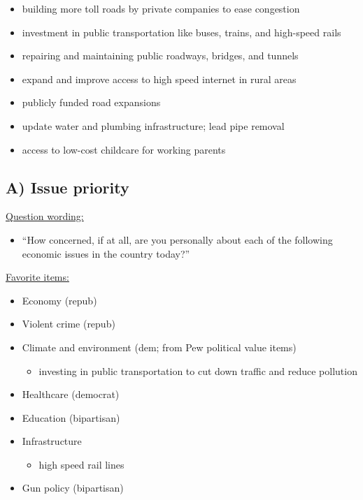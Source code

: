 \documentclass[
]{book}
\providecommand{\tightlist}{%
  \setlength{\itemsep}{0pt}\setlength{\parskip}{0pt}}
\begin{document}
\begin{itemize}
\item
  building more toll roads by private companies to ease congestion
\item
  investment in public transportation like buses, trains, and high-speed rails
\item
  repairing and maintaining public roadways, bridges, and tunnels
\item
  expand and improve access to high speed internet in rural areas
\item
  publicly funded road expansions
\item
  update water and plumbing infrastructure; lead pipe removal
\item
  access to low-cost childcare for working parents
\end{itemize}

\hypertarget{a-issue-priority}{%
\subsection{A) Issue priority}\label{a-issue-priority}}

\uline{Question wording:}

\begin{itemize}
\tightlist
\item
  ``How concerned, if at all, are you personally about each of the
  following economic issues in the country today?''
\end{itemize}

\uline{Favorite items:}

\begin{itemize}
\tightlist
\item
  Economy (repub)
\item
  Violent crime (repub)
\item
  Climate and environment (dem; from Pew political value items)

  \begin{itemize}
  \tightlist
  \item
    investing in public transportation to cut down traffic and reduce pollution
  \end{itemize}
\item
  Healthcare (democrat)
\item
  Education (bipartisan)
\item
  Infrastructure

  \begin{itemize}
  \tightlist
  \item
    high speed rail lines
  \end{itemize}
\item
  Gun policy (bipartisan)
\end{itemize}
\end{document}

